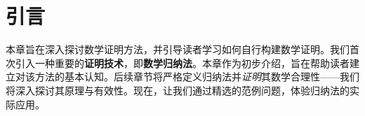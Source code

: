 \section{引言}

本章旨在深入探讨数学证明方法，并引导读者学习如何自行构建数学证明。我们首次引入一种重要的\textbf{证明技术}，即\textbf{数学归纳法}。本章作为初步介绍，旨在帮助读者建立对该方法的基本认知。后续章节将严格定义归纳法并\emph{证明}其数学合理性——我们将深入探讨其原理与有效性。现在，让我们通过精选的范例问题，体验归纳法的实际应用。







